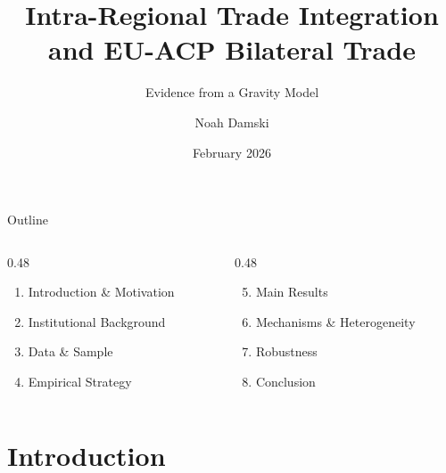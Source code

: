 \documentclass[aspectratio=169,11pt]{beamer}
\title[EU-ACP Trade Integration]{Intra-Regional Trade Integration and EU-ACP Bilateral Trade}
\subtitle{Evidence from a Gravity Model}
\author[Noah Damski]{Noah Damski}
\institute[University of Florida]{Department of Economics \\ University of Florida}
\date{February 2026}
\begin{document}
\begin{frame}
    \titlepage
\end{frame}

\begin{frame}{Outline}
    \begin{columns}[T]
        \begin{column}{0.48\textwidth}
            \begin{enumerate}
                \item Introduction \& Motivation
                \item Institutional Background
                \item Data \& Sample
                \item Empirical Strategy
            \end{enumerate}
        \end{column}
        \begin{column}{0.48\textwidth}
            \begin{enumerate}\setcounter{enumi}{4}
                \item Main Results
                \item Mechanisms \& Heterogeneity
                \item Robustness
                \item Conclusion
            \end{enumerate}
        \end{column}
    \end{columns}
\end{frame}

\section{Introduction}
\end{document}
